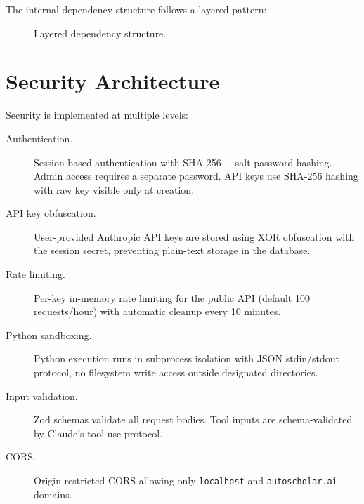 The internal dependency structure follows a layered pattern:

\begin{figure}[H]
\centering
{}
\caption{Layered dependency structure.}
\label{fig:dependency-layers}
\end{figure}

\section{Security Architecture}
\label{sec:arch:security}

Security is implemented at multiple levels:

\begin{description}
  \item[Authentication.] Session-based authentication with SHA-256 + salt password hashing. Admin access requires a separate password. API keys use SHA-256 hashing with raw key visible only at creation.
  \item[API key obfuscation.] User-provided Anthropic API keys are stored using XOR obfuscation with the session secret, preventing plain-text storage in the database.
  \item[Rate limiting.] Per-key in-memory rate limiting for the public API (default 100 requests/hour) with automatic cleanup every 10 minutes.
  \item[Python sandboxing.] Python execution runs in subprocess isolation with JSON stdin/stdout protocol, no filesystem write access outside designated directories.
  \item[Input validation.] Zod schemas validate all request bodies. Tool inputs are schema-validated by Claude's tool-use protocol.
  \item[CORS.] Origin-restricted CORS allowing only \texttt{localhost} and \texttt{autoscholar.ai} domains.
\end{description}

